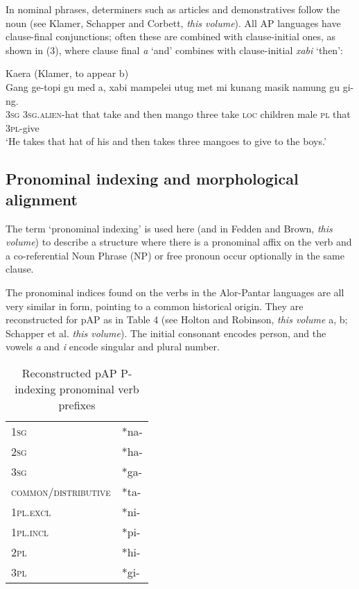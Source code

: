 In nominal phrases, determiners such as articles and demonstratives follow the noun (see Klamer, Schapper and Corbett, \textit{this volume}). All AP languages have clause-final conjunctions; often these are combined with clause-initial ones, as shown in (3), where clause final \textit{a} `and' combines with clause-initial \textit{xabi} `then':



\ea%
\label{ex:3}
Kaera (Klamer, to appear b)\\
\gll Gang  ge-topi  gu  med  a, xabi  mampelei  utug  met  mi  kunang  masik   namung  gu  gi-ng. \\
 \textsc{3sg}  \textsc{3sg.alien-}hat  that  take  and  then  mango  three  take  \textsc{loc} children  male  \textsc{pl} that  \textsc{3pl}{}-give     \\
\glt  `He takes that hat of his and  then takes three mangoes to give to the boys.'
\z


\subsection{Pronominal indexing and morphological alignment}
The term `pronominal indexing' is used here (and in Fedden and Brown, \textit{this volume}) to describe a structure where there is a pronominal affix on the verb and a co-referential Noun Phrase (NP) or free pronoun occur optionally in the same clause.

The pronominal indices found on the verbs in the Alor-Pantar languages are all very similar in form, pointing to a common historical origin. They are reconstructed for pAP as in Table 4 (see Holton and Robinson, \textit{this volume} a, b; Schapper et al. \textit{this volume}). The initial consonant encodes person, and the vowels \textit{a} and \textit{i} encode singular and plural number.

\begin{table}\centering


\begin{tabular}{ll}

{\scshape 1sg} & *na-\\
{\scshape 2sg} & *ha-\\
{\scshape 3sg} & *ga-\\
{\scshape common/distributive} & *ta-\\
{\scshape 1pl.excl} & *ni-  \\
{\scshape 1pl.incl} & *pi-\\
{\scshape 2pl} & *hi-\\
{\scshape 3pl} & *gi-\\
\end{tabular}
\caption{Reconstructed pAP P-indexing pronominal verb prefixes }
\end{table}

